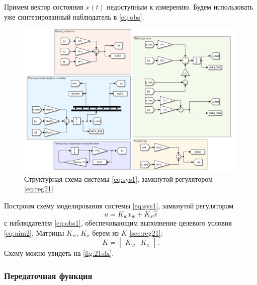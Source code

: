 Примем вектор состояния $x(t)$ недоступным к измерению. Будем использовать
уже синтезированный наблюдатель в \autoref{eq:obs}.
\begin{figure}[H]
    \centering
    \includegraphics[width=\linewidth]{figs/2_1_slx.png}
    \caption{Структурная схема системы \eqref{eq:sys1}, замкнутой регулятором
    \eqref{eq:reg21}}
    \label{fig:21slx}
\end{figure}
\noindent Построим схему моделирования системы \eqref{eq:sys1}, замкнутой регулятором
\begin{equation}
    \label{eq:reg21}
    u=K_wx_w+K_x\hat x
\end{equation}
с наблюдателем \eqref{eq:obs1},
обеспечивающим выполнение целевого условия \eqref{eq:aim2}. Матрицы $K_w$, $K_x$
берем из $K$ \autoref{sec:reg21}:
\begin{equation*}
    K=\begin{bmatrix}
        K_w & K_x
    \end{bmatrix}.
\end{equation*}
Схему можно увидеть на \autoref{fig:21slx}. 

\subsubsection{Передаточная функция}

